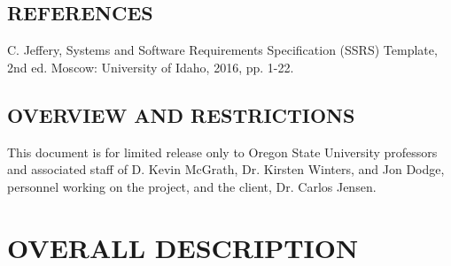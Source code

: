 \documentclass[letterpaper, 10pt, draftclsnofoot, compsoc, onecolumn]{IEEEtran}
\begin{document}
\subsection[REFERENCES]{\rmfamily\bfseries\color{black} REFERENCES}

{\noindent
[1] C.  Jeffery, Systems and Software Requirements Specification (SSRS) Template, 2nd ed. Moscow: University of Idaho, 2016, pp. 1-22.}

\subsection[OVERVIEW AND RESTRICTIONS]{\rmfamily\bfseries\color{black} OVERVIEW AND RESTRICTIONS}


{\noindent
This document is for limited release only to Oregon State University professors and
associated staff of D. Kevin McGrath, Dr. Kirsten Winters, and Jon Dodge, personnel
working on the project, and the client, Dr. Carlos Jensen.}


\bigskip



\bigskip



\bigskip




\bigskip


\clearpage
\section[OVERALL DESCRIPTION]{\rmfamily\bfseries\color{black} OVERALL DESCRIPTION}
\end{document}
